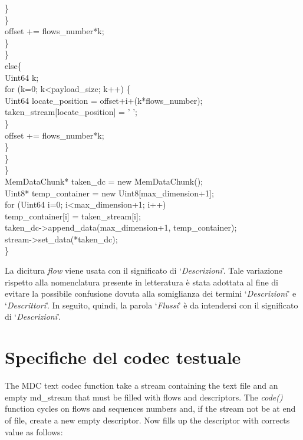 \begin{code}
						\}\\
					\}\\
					offset += flows\_number*k;\\
				\}\\
			\}\\
			else\{\\
				Uint64 k;\\
				for (k=0; k<payload\_size; k++) \{\\
					Uint64 locate\_position = offset+i+(k*flows\_number);\\
					taken\_stream[locate\_position] = ' ';\\
				\}\\
				offset += flows\_number*k;\\
			\}\\
		\}\\
	\}\\
	MemDataChunk* taken\_dc = new MemDataChunk();\\
	Uint8* temp\_container = new Uint8[max\_dimension+1];\\
	for (Uint64 i=0; i<max\_dimension+1; i++)\\
		temp\_container[i] = taken\_stream[i];\\
	taken\_dc->append\_data(max\_dimension+1, temp\_container);\\
	stream->set\_data(*taken\_dc);\\
\}\\
\end{code}

\begin{notabene}
La dicitura \textit{flow} viene usata con il significato di
`\emph{Descrizioni}'. Tale variazione rispetto alla nomenclatura presente in
letteratura è stata adottata al fine di evitare la possibile confusione dovuta alla somiglianza dei termini `\emph{Descrizioni}' e `\emph{Descrittori}'. In seguito, quindi, la parola `\emph{Flussi}' è da intendersi con il significato di `\emph{Descrizioni}'.
\end{notabene}

\section{Specifiche del codec testuale}
The MDC text codec function take a stream containing the text file and an empty
md\_stream that must be filled with flows and descriptors. The \textit{code()}
function cycles on flows and sequences numbers and, if the stream not be at end of file, create a new empty descriptor.
Now fills up the descriptor with corrects value as follows: 


